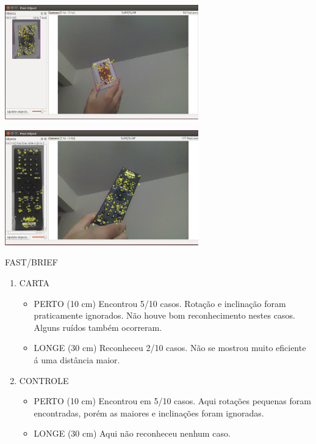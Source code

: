 \documentclass[conference]{IEEEtran}
\begin{document}
 		\vspace{2\baselineskip}\vspace{-\parskip}
 		\begin{minipage}{\linewidth}
 		\centering
 		\includegraphics[width=3.3in]{carta5longe}
 		\end{minipage}	
 
		\vspace{2\baselineskip}\vspace{-\parskip}
 		\begin{minipage}{\linewidth}
 		\centering
 		\includegraphics[width=3.3in]{controle6perto}
 		\end{minipage}	 
 
 
 
 \vspace{1.2\baselineskip}\vspace{-\parskip} 
 
 \centering FAST/BRIEF
  \begin{enumerate}
  \item CARTA
    \begin{itemize}
     \item PERTO (10 cm)
      Encontrou 5/10 casos. Rota\c{c}\~ao e inclina\c{c}\~ao foram praticamente ignorados. N\~ao houve bom reconhecimento 
      nestes casos. Alguns ru\'idos tamb\'em ocorreram.
     \item LONGE (30 cm)
      Reconheceu 2/10 casos. N\~ao se mostrou muito eficiente \'a uma dist\^ancia maior.
    \end{itemize}
  \item CONTROLE
    \begin{itemize}
     \item PERTO (10 cm)
      Encontrou em 5/10 casos. Aqui rota\c{c}\~oes pequenas foram encontradas, por\'em as maiores e inclina\c{c}\~oes foram 
      ignoradas.
     \item LONGE (30 cm)
      Aqui n\~ao reconheceu nenhum caso.
    \end{itemize}
 \end{enumerate}
\end{document}
